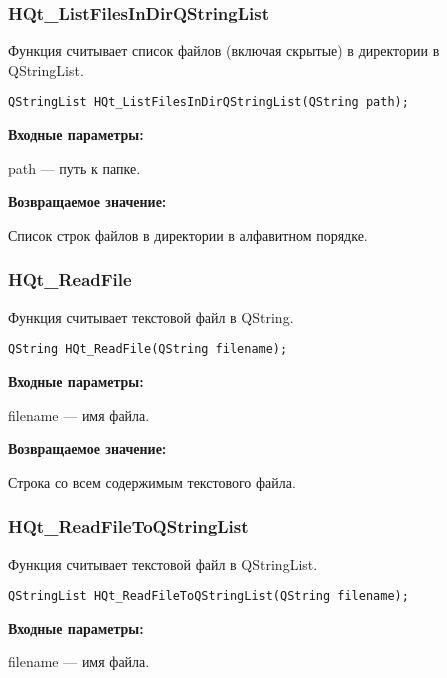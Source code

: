 \documentclass[a4paper,12pt]{article}
\begin{document}
\subsubsection{HQt\_ListFilesInDirQStringList}\label{HQt_ListFilesInDirQStringList}

Функция считывает список файлов (включая скрытые) в директории в QStringList.


\begin{lstlisting}[label=code_syntax_HQt_ListFilesInDirQStringList,caption=Синтаксис]
QStringList HQt_ListFilesInDirQStringList(QString path);
\end{lstlisting}

\textbf{Входные параметры:}

path --- путь к папке.

\textbf{Возвращаемое значение:}

Список строк файлов в директории в алфавитном порядке.


\subsubsection{HQt\_ReadFile}\label{HQt_ReadFile}

Функция считывает текстовой файл в QString.


\begin{lstlisting}[label=code_syntax_HQt_ReadFile,caption=Синтаксис]
QString HQt_ReadFile(QString filename);
\end{lstlisting}

\textbf{Входные параметры:}

filename --- имя файла.

\textbf{Возвращаемое значение:}

Строка со всем содержимым текстового файла.


\subsubsection{HQt\_ReadFileToQStringList}\label{HQt_ReadFileToQStringList}

Функция считывает текстовой файл в QStringList.


\begin{lstlisting}[label=code_syntax_HQt_ReadFileToQStringList,caption=Синтаксис]
QStringList HQt_ReadFileToQStringList(QString filename);
\end{lstlisting}

\textbf{Входные параметры:}

filename --- имя файла.
\end{document}
